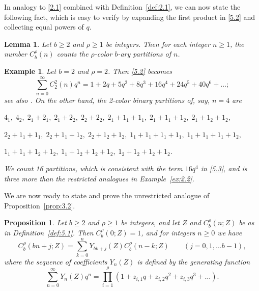 \documentclass{amsart}
\theoremstyle{plain}
\newtheorem{example}[theorem]{Example}
\newtheorem{proposition}[theorem]{Proposition}
\newtheorem{lemma}[theorem]{Lemma}
\numberwithin{equation}{section}
\begin{document}
In analogy to \eqref{2.1} combined with Definition~\ref{def:2.1}, we can now 
state the following fact, which is easy to verify by expanding the first 
product in \eqref{5.2} and collecting equal powers of $q$.

\begin{lemma}\label{lem:5.2} 
Let $b\geq 2$ and $\rho\geq 1$ be integers. Then for each integer $n\geq 1$, 
the number $C_b^\rho(n)$ counts the $\rho$-color $b$-ary partitions of $n$.
\end{lemma}

\begin{example}\label{ex:5.3}
{\rm Let $b=2$ and $\rho=2$. Then \eqref{5.2} becomes
\begin{equation}\label{5.3}
\sum_{n=0}^\infty C_2^2(n)q^n = 1+2q+5q^2+8q^3+16q^4+24q^5+40q^6+\ldots;
\end{equation}
see also \cite[A171238]{OEIS}. On the other hand, the 2-color binary partitions
of, say, $n=4$ are}

$4_1,\;4_2,\;2_1+2_1,\;2_1+2_2,\;2_2+2_2,\;2_1+1_1+1_1,\;2_1+1_1+1_2,\;
2_1+1_2+1_2,$

$2_2+1_1+1_1,\;2_2+1_1+1_2,\; 2_2+1_2+1_2,\;1_1+1_1+1_1+1_1,\;
1_1+1_1+1_1+1_2,$

$1_1+1_1+1_2+1_2,\; 1_1+1_2+1_2+1_2,\; 1_2+1_2+1_2+1_2.$

\noindent
{\rm We count 16 partitions, which is consistent with the term $16q^4$ in 
\eqref{5.3}, and is three more than the restricted analogues in 
Example~\ref{ex:2.2}.}
\end{example}

We are now ready to state and prove the unrestricted analogue of 
Proposition~\ref{prop:3.2}.

\begin{proposition}\label{prop:5.4}
Let $b\geq 2$ and $\rho\geq 1$ be integers, and let $Z$ and $C_b^\rho(n;Z)$ be 
as in Definition~\ref{def:5.1}. Then $C_b^\rho(0;Z)=1$, and for integers 
$n\geq 0$ we have
\begin{equation}\label{5.4}
C_b^\rho(bn+j;Z)
= \sum_{k=0}^n Y_{bk+j}(Z)C_b^\rho(n-k;Z) \qquad (j=0, 1,\ldots b-1),
\end{equation}
where the sequence of coefficients $Y_n(Z)$ is defined by the generating 
function
\begin{equation}\label{5.5}
\sum_{n=0}^\infty Y_n(Z)q^n = \prod_{i=1}^\rho
\left(1+z_{i,1}q+z_{i,2}q^2+z_{i,3}q^3+\dots\right).
\end{equation}
\end{proposition}
\end{document}
